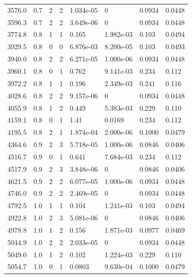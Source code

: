 \documentclass[preview]{standalone}
\begin{document}
{{{\begin{tabular}{L{1.2cm}C{1.2cm} C{0.3cm}C{0.5cm} C{1.4cm}C{1.4cm} C{1.4cm}C{1.4cm}}
  3576.0  &   0.7  & 2     &  2 &  1.034e-05  & 0  & 0.0934 &  0.0448   \\ 
  3596.3  &   0.7  & 2     &  2 &  3.649e-06  & 0  & 0.0934 &  0.0448   \\ 
  3774.8  &   0.8  & 1     &  1 &  0.165  & 1.982e-03  & 0.103 &  0.0494   \\ 
  3929.5  &   0.8  & 0     &  0 &  6.876e-03  & 8.200e-05  & 0.103 &  0.0493   \\ 
  3940.0  &   0.8  & 2     &  2 &  6.271e-05  & 1.000e-06  & 0.0934 &  0.0448   \\ 
  3960.1  &   0.8  & 0     &  1 &  0.762  & 9.141e-03  & 0.234 &  0.112   \\ 
  3972.2  &   0.8  & 1     &  1 &  0.196  & 2.349e-03  & 0.241 &  0.116   \\ 
  4028.6  &   0.8  & 2     &  2 &  9.157e-06  & 0  & 0.0934 &  0.0448   \\ 
  4055.9  &   0.8  & 1     &  2 &  0.449  & 5.383e-03  & 0.229 &  0.110   \\ 
  4159.1  &   0.8  & 0     &  1 &  1.41  & 0.0169  & 0.234 &  0.112   \\ 
  4195.5  &   0.8  & 2     &  1 &  1.874e-04  & 2.000e-06  & 0.1000 &  0.0479   \\ 
  4364.6  &   0.9  & 2     &  3 &  5.718e-05  & 1.000e-06  & 0.0846 &  0.0406   \\ 
  4516.7  &   0.9  & 0     &  1 &  0.641  & 7.684e-03  & 0.234 &  0.112   \\ 
  4517.9  &   0.9  & 2     &  3 &  3.848e-06  & 0  & 0.0846 &  0.0406   \\ 
  4621.5  &   0.9  & 2     &  2 &  6.077e-05  & 1.000e-06  & 0.0934 &  0.0448   \\ 
  4746.0  &   0.9  & 2     &  2 &  2.469e-05  & 0  & 0.0934 &  0.0448   \\ 
  4792.5  &   1.0  & 1     &  1 &  0.104  & 1.241e-03  & 0.103 &  0.0494   \\ 
  4922.8  &   1.0  & 2     &  3 &  5.081e-06  & 0  & 0.0846 &  0.0406   \\ 
  4978.8  &   1.0  & 1     &  2 &  0.156  & 1.871e-03  & 0.0977 &  0.0469   \\ 
  5044.9  &   1.0  & 2     &  2 &  2.033e-05  & 0  & 0.0934 &  0.0448   \\ 
  5049.0  &   1.0  & 1     &  2 &  0.102  & 1.224e-03  & 0.229 &  0.110   \\ 
  5054.7  &   1.0  & 0     &  1 &  0.0803  & 9.630e-04  & 0.1000 &  0.0479   \\ 

\end{tabular}}}}
\end{document}
